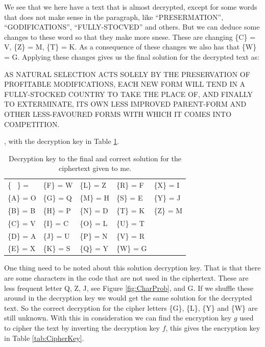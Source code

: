 \documentclass[a4paper, 11pt]{article}
\begin{document}
We see that we here have a text that is almost decrypted, except for some 
words that does not make sense in the paragraph, like ``PRESERMATION'',
``GODIFICATIONS'', ``FULLY-STOCVED'' and others. But we can deduce some changes
to these word so that they make more snese. These are changing 
\{C\} = V, \{Z\} = M, \{T\} = K. As a consequence of these changes
we also has that \{W\} = G. Applying these changes gives us the final
solution for the decrypted text as:

\begin{adjustwidth}{1.5em}{0pt}
  \small
  AS NATURAL SELECTION ACTS SOLELY BY THE PRESERVATION OF
  PROFITABLE MODIFICATIONS, EACH NEW FORM WILL TEND IN A FULLY-STOCKED 
  COUNTRY TO TAKE THE PLACE OF, AND FINALLY TO EXTERMINATE, ITS
  OWN LESS IMPROVED PARENT-FORM AND OTHER LESS-FAVOURED FORMS WITH
  WHICH IT COMES INTO COMPETITION.
\end{adjustwidth}

, with the decryption key in Table \ref{tab:FinalKey}.

\begin{table}[h!]
  \centering
  \caption{Decryption key to the final and correct solution for the 
  ciphertext given to me.}
  \begin{tabular}{l l l l l}
  \{ \ \} =    &  \{F\} = W  &  \{L\} = Z  &  \{R\} = F  &  \{X\} = I  \\
  \{A\} = O  &  \{G\} = Q  &  \{M\} = H  &  \{S\} = E  &  \{Y\} = J  \\
  \{B\} = B  &  \{H\} = P  &  \{N\} = D  &  \{T\} = K  &  \{Z\} = M  \\
  \{C\} = V  &  \{I\} = C  &  \{O\} = L  &  \{U\} = T  &  \ \\
  \{D\} = A  &  \{J\} = U  &  \{P\} = N  &  \{V\} = R  &  \ \\
  \{E\} = X  &  \{K\} = S  &  \{Q\} = Y  &  \{W\} = G  &  \ \\
  \end{tabular}
  \label{tab:FinalKey}
\end{table}

One thing need to be noted about this solution decryption key. That is that 
there are some characters in the code that are not used in the ciphertext.
These are less frequent letter Q, Z, J, see Figure \ref{fig:CharProb}, and G.
If we shuffle these around in the decryption key we would get the same 
solution for the decrypted text. So the correct decryption for the cipher 
letters \{G\}, \{L\}, \{Y\} and \{W\} are still unknown. With this in 
consideration we can find the encryption key $g$ used to cipher the text by
inverting the decryption key $f$, this gives the encryption key in
Table \ref{tab:CipherKey}.
\end{document}
